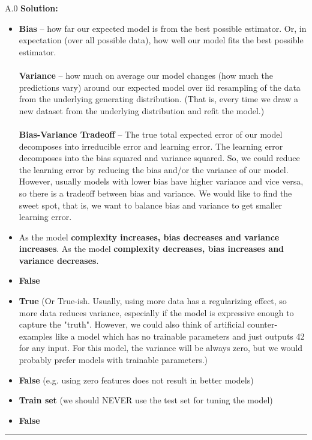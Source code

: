 \documentclass{article}
\newcommand{\1}{\mathbf{1}}
\begin{document}
A.0 {\bf Solution:}\\
\begin{itemize}
    \item {\bf Bias} -- how far our expected model is from the best possible estimator. Or, in expectation (over all possible data), how well our model fits the best possible estimator.\\
    \\
    {\bf Variance} -- how much on average our model changes (how much the predictions vary) around our expected model over iid resampling of the data from the underlying generating distribution. (That is, every time we draw a new dataset from the underlying distribution and refit the model.) \\
    \\
    {\bf Bias-Variance Tradeoff} -- The true total expected error of our model decomposes into irreducible error and learning error. The learning error decomposes into the bias squared and variance squared. So, we could reduce the learning error by reducing the bias and/or the variance of our model. However, usually models with lower bias have higher variance and vice versa, so there is a tradeoff between bias and variance. We would like to find the sweet spot, that is, we want to balance bias and variance to get smaller learning error.
    \item As the model {\bf complexity increases, bias decreases and variance increases}. As the model {\bf complexity decreases, bias increases and variance decreases}.
    \item {\bf False}
    \item {\bf True} (Or True-ish. Usually, using more data has a regularizing effect, so more data reduces variance, especially if the model is expressive enough to capture the "truth". However, we could also think of artificial counter-examples like a model which has no trainable parameters and just outputs 42 for any input. For this model, the variance will be always zero, but we would probably prefer models with trainable parameters.)
    \item {\bf False} (e.g. using zero features does not result in better models)
    \item {\bf Train set} (we should NEVER use the test set for tuning the model)
    \item {\bf False}
\end{itemize}

\noindent\rule{\textwidth}{1pt}
\end{document}
